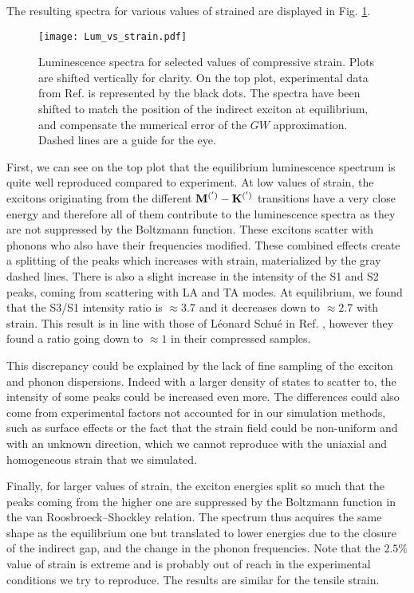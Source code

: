 The resulting spectra for various values of strained are displayed in Fig. \ref{fig:Lum_vs_strain}.
\begin{figure}[h!tb]
	\vspace{0.2cm}
	\setcapindent{2em}
	\centering
	\texttt{[image: Lum\_vs\_strain.pdf]}
	\caption{Luminescence spectra for selected values of compressive strain. Plots are shifted vertically for clarity. On the top plot, experimental data from Ref. \cite{schue2019bright} is represented by the black dots. The spectra have been shifted to match the position of the indirect exciton at equilibrium, and compensate the numerical error of the $GW$ approximation.\cite{artus2021ellipsometry} Dashed lines are a guide for the eye.}
	\label{fig:Lum_vs_strain}
\end{figure}
First, we can see on the top plot that the equilibrium luminescence spectrum is quite well reproduced compared to experiment. At low values of strain, the excitons originating from the different $\bf{ M^{(')}} - \bf{ K^{(')}}$ transitions have a very close energy and therefore all of them contribute to the luminescence spectra as they are not suppressed by the Boltzmann function. These excitons scatter with phonons who also have their frequencies modified. These combined effects create a splitting of the peaks which increases with strain, materialized by the gray dashed lines. There is also a slight increase in the intensity of the S1 and S2 peaks, coming from scattering with LA and TA modes. At equilibrium, we found that the S3/S1 intensity ratio is $\approx 3.7$ and it decreases down to $\approx 2.7$ with strain. This result is in line with those of Léonard Schué in Ref. \cite{schue2017proprietes}, however they found a ratio going down to $\approx 1$ in their compressed samples.

This discrepancy could be explained by the lack of fine sampling of the exciton and phonon dispersions. Indeed with a larger density of states to scatter to, the intensity of some peaks could be increased even more. The differences could also come from experimental factors not accounted for in our simulation methods, such as surface effects or the fact that the strain field could be non-uniform and with an unknown direction, which we cannot reproduce with the uniaxial and homogeneous strain that we simulated.  

Finally, for larger values of strain, the exciton energies split so much that the peaks coming from the higher one are suppressed by the Boltzmann function in the van Roosbroeck--Shockley relation. The spectrum thus acquires the same shape as the equilibrium one but translated to lower energies due to the closure of the indirect gap, and the change in the phonon frequencies. Note that the $2.5\%$ value of strain is extreme and is probably out of reach in the experimental conditions we try to reproduce. The results are similar for the tensile strain.

